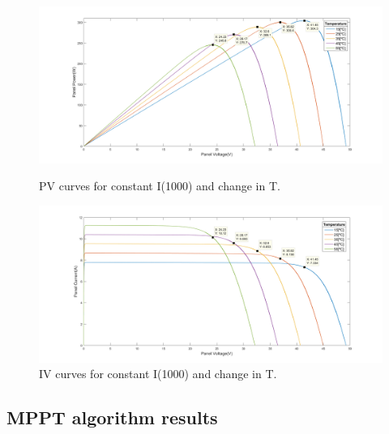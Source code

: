 \begin{figure}[H]
	\begin{minipage}[b]{0.8\linewidth}
		\centering
		\includegraphics[width=\textwidth]{../Pictures/PV_curves_1000_irradiance}
		\caption{PV curves for constant I(1000) and change in T.}
		\label{fig:PVcurves_Irr1000}
	\end{minipage}
	\hspace{0.5cm}
	\begin{minipage}[b]{0.8\linewidth}
		\centering
		\includegraphics[width=\textwidth]{../Pictures/IV_curves_1000_irradiance}
		\caption{IV curves for constant I(1000) and change in T.}
		\label{fig:IVcurves_Irr1000}
	\end{minipage}
\end{figure}

\subsection{MPPT algorithm results}


